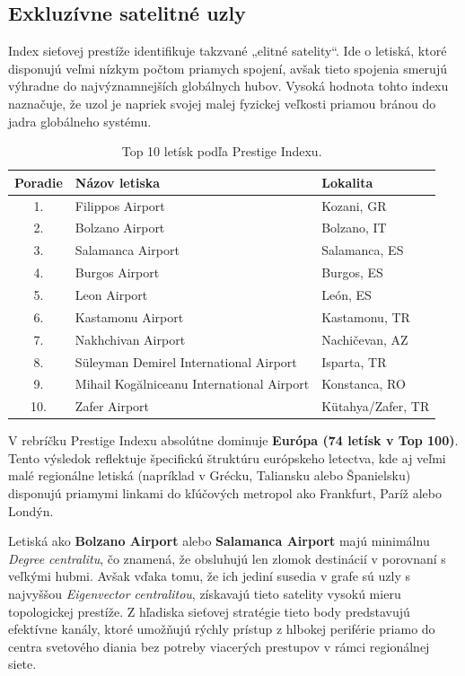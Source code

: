 \subsection{Exkluzívne satelitné uzly}

Index sieťovej prestíže identifikuje takzvané „elitné satelity“. Ide o letiská, ktoré disponujú veľmi nízkym počtom priamych spojení, avšak tieto 
spojenia smerujú výhradne do najvýznamnejších globálnych hubov. Vysoká hodnota tohto indexu naznačuje, že uzol je napriek svojej malej fyzickej 
veľkosti priamou bránou do jadra globálneho systému.

\begin{table}[H]
\centering
\small
\begin{tabular}{cll}
\hline
\textbf{Poradie} & \textbf{Názov letiska} & \textbf{Lokalita} \\ \hline
1. & Filippos Airport & Kozani, GR \\
2. & Bolzano Airport & Bolzano, IT \\
3. & Salamanca Airport & Salamanca, ES \\
4. & Burgos Airport & Burgos, ES \\
5. & Leon Airport & León, ES \\
6. & Kastamonu Airport & Kastamonu, TR \\
7. & Nakhchivan Airport & Nachičevan, AZ \\
8. & Süleyman Demirel International Airport & Isparta, TR \\
9. & Mihail Kogălniceanu International Airport & Konstanca, RO \\
10. & Zafer Airport & Kütahya/Zafer, TR \\ \hline
\end{tabular}
\caption{\centering Top 10 letísk podľa Prestige Indexu.}
\label{tab:prestige_index}
\end{table}

V rebríčku Prestige Indexu absolútne dominuje \textbf{Európa (74 letísk v Top 100)}. Tento výsledok reflektuje špecifickú štruktúru európskeho letectva, 
kde aj veľmi malé regionálne letiská (napríklad v Grécku, Taliansku alebo Španielsku) disponujú priamymi linkami do kľúčových metropol ako Frankfurt, 
Paríž alebo Londýn.

Letiská ako \textbf{Bolzano Airport} alebo \textbf{Salamanca Airport} majú minimálnu \textit{Degree centralitu}, čo znamená, že obsluhujú len zlomok 
destinácií v porovnaní s veľkými hubmi. Avšak vďaka tomu, že ich jediní susedia v grafe sú uzly s najvyššou \textit{Eigenvector centralitou}, získavajú 
tieto satelity vysokú mieru topologickej prestíže. Z hľadiska sieťovej stratégie tieto body predstavujú efektívne kanály, ktoré umožňujú rýchly prístup 
z hlbokej periférie priamo do centra svetového diania bez potreby viacerých prestupov v rámci regionálnej siete.